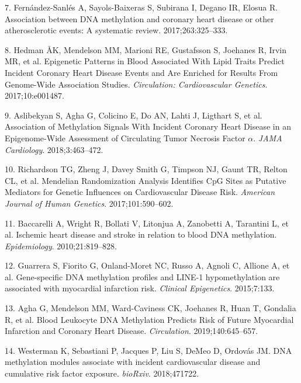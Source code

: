 \documentclass[]{article}
\begin{document}
\leavevmode\hypertarget{ref-Fernandez-Sanles2017}{}%
7. Fernández-Sanlés A, Sayols-Baixeras S, Subirana I, Degano IR, Elosua
R. Association between DNA methylation and coronary heart disease or
other atherosclerotic events: A systematic review. 2017;263:325--333.

\leavevmode\hypertarget{ref-Hedman2017}{}%
8. Hedman ÅK, Mendelson MM, Marioni RE, Gustafsson S, Joehanes R, Irvin
MR, et al. Epigenetic Patterns in Blood Associated With Lipid Traits
Predict Incident Coronary Heart Disease Events and Are Enriched for
Results From Genome-Wide Association Studies. \emph{Circulation:
Cardiovascular Genetics}. 2017;10:e001487.

\leavevmode\hypertarget{ref-Aslibekyan2018}{}%
9. Aslibekyan S, Agha G, Colicino E, Do AN, Lahti J, Ligthart S, et al.
Association of Methylation Signals With Incident Coronary Heart Disease
in an Epigenome-Wide Assessment of Circulating Tumor Necrosis Factor
\(\alpha\). \emph{JAMA Cardiology}. 2018;3:463--472.

\leavevmode\hypertarget{ref-Richardson2017}{}%
10. Richardson TG, Zheng J, Davey Smith G, Timpson NJ, Gaunt TR, Relton
CL, et al. Mendelian Randomization Analysis Identifies CpG Sites as
Putative Mediators for Genetic Influences on Cardiovascular Disease
Risk. \emph{American Journal of Human Genetics}. 2017;101:590--602.

\leavevmode\hypertarget{ref-Baccarelli2010}{}%
11. Baccarelli A, Wright R, Bollati V, Litonjua A, Zanobetti A,
Tarantini L, et al. Ischemic heart disease and stroke in relation to
blood DNA methylation. \emph{Epidemiology}. 2010;21:819--828.

\leavevmode\hypertarget{ref-Guarrera2015}{}%
12. Guarrera S, Fiorito G, Onland-Moret NC, Russo A, Agnoli C, Allione
A, et al. Gene-specific DNA methylation profiles and LINE-1
hypomethylation are associated with myocardial infarction risk.
\emph{Clinical Epigenetics}. 2015;7:133.

\leavevmode\hypertarget{ref-Agha2019}{}%
13. Agha G, Mendelson MM, Ward-Caviness CK, Joehanes R, Huan T, Gondalia
R, et al. Blood Leukocyte DNA Methylation Predicts Risk of Future
Myocardial Infarction and Coronary Heart Disease. \emph{Circulation}.
2019;140:645--657.

\leavevmode\hypertarget{ref-Westerman2018}{}%
14. Westerman K, Sebastiani P, Jacques P, Liu S, DeMeo D, Ordovás JM.
DNA methylation modules associate with incident cardiovascular disease
and cumulative risk factor exposure. \emph{bioRxiv}. 2018;471722.
\end{document}
